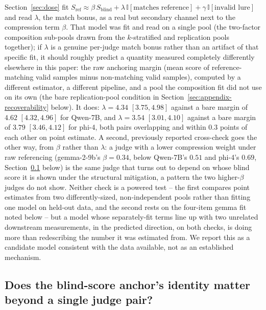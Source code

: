 \documentclass[11pt]{article}
\begin{document}
Section~\ref{sec:dose} fit $S_{\mathrm{ref}} \approx \beta\, S_{\mathrm{blind}} + \lambda\, \mathbb{I}[\text{matches reference}] + \gamma\, \mathbb{I}[\text{invalid lure}]$ and read $\lambda$, the match bonus, as a real but secondary channel next to the compression term $\beta$. That model was fit and read on a single pool (the two-factor composition sub-pools drawn from the $k$-stratified and replication pools together); if $\lambda$ is a genuine per-judge match bonus rather than an artifact of that specific fit, it should roughly predict a quantity measured completely differently elsewhere in this paper: the raw anchoring margin (mean score of reference-matching valid samples minus non-matching valid samples), computed by a different estimator, a different pipeline, and a pool the composition fit did not use on its own (the bare replication-pool condition in Section~\ref{sec:appendix-recoverability} below). It does: $\lambda = 4.34$ $[3.75, 4.98]$ against a bare margin of $4.62$ $[4.32, 4.96]$ for Qwen-7B, and $\lambda = 3.54$ $[3.01, 4.10]$ against a bare margin of $3.79$ $[3.46, 4.12]$ for phi-4, both pairs overlapping and within $0.3$ points of each other on point estimate. A second, previously reported cross-check goes the other way, from $\beta$ rather than $\lambda$: a judge with a lower compression weight under raw referencing (gemma-2-9b's $\beta = 0.34$, below Qwen-7B's $0.51$ and phi-4's $0.69$, Section~\ref{sec:appendix-identity} below) is the same judge that turns out to depend on whose blind score it is shown under the structural mitigation, a pattern the two higher-$\beta$ judges do not show. Neither check is a powered test -- the first compares point estimates from two differently-sized, non-independent pools rather than fitting one model on held-out data, and the second rests on the four-item gemma fit noted below -- but a model whose separately-fit terms line up with two unrelated downstream measurements, in the predicted direction, on both checks, is doing more than redescribing the number it was estimated from. We report this as a candidate model consistent with the data available, not as an established mechanism.

\subsection{Does the blind-score anchor's identity matter beyond a single judge pair?}
\label{sec:appendix-identity}
\end{document}
